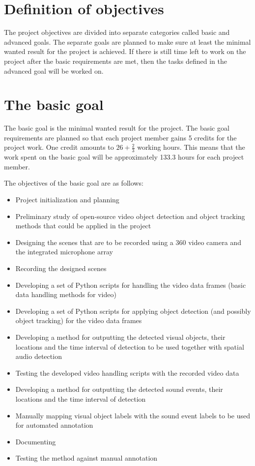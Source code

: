 \section{Definition of objectives}


The project objectives are divided into separate categories called basic and advanced goals. The separate goals are planned to make sure at least the minimal wanted result for the project is achieved. If there is still time left to work on the project after the basic requirements are met, then the tasks defined in the advanced goal will be worked on.

\section{The basic goal}

The basic goal is the minimal wanted result for the project. The basic goal requirements are planned so that each project member gains 5 credits for the project work. One credit amounts to $26+\frac{2}{3}$ working hours. This means that the work spent on the basic goal will be approximately 133.3 hours for each project member. 

The objectives of the basic goal are as follows:

\begin{itemize}
	\item Project initialization and planning
	\item Preliminary study of open-source video object detection and object tracking methods that could be applied in the project
	\item Designing the scenes that are to be recorded using a 360 video camera and the integrated microphone array
	\item Recording the designed scenes
	\item Developing a set of Python scripts for handling the video data frames (basic data handling methods for video)
	\item Developing a set of Python scripts for applying object detection (and possibly object tracking) for the video data frames
	\item Developing a method for outputting the detected visual objects, their locations and the time interval of detection to be used together with spatial audio detection
	\item Testing the developed video handling scripts with the recorded video data
	\item Developing a method for outputting the detected sound events, their locations and the time interval of detection
	\item Manually mapping visual object labels with the sound event labels to be used for automated annotation
	\item Documenting
	\item Testing the method against manual annotation
\end{itemize} 

